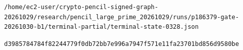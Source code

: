 \documentclass[10pt]{article}
\begin{document}
\texttt{\small /\allowbreak{}h\allowbreak{}o\allowbreak{}m\allowbreak{}e\allowbreak{}/\allowbreak{}e\allowbreak{}c\allowbreak{}2\allowbreak{}-\allowbreak{}u\allowbreak{}s\allowbreak{}e\allowbreak{}r\allowbreak{}/\allowbreak{}c\allowbreak{}r\allowbreak{}y\allowbreak{}p\allowbreak{}t\allowbreak{}o\allowbreak{}-\allowbreak{}p\allowbreak{}e\allowbreak{}n\allowbreak{}c\allowbreak{}i\allowbreak{}l\allowbreak{}-\allowbreak{}s\allowbreak{}i\allowbreak{}g\allowbreak{}n\allowbreak{}e\allowbreak{}d\allowbreak{}-\allowbreak{}g\allowbreak{}r\allowbreak{}a\allowbreak{}p\allowbreak{}h\allowbreak{}-\allowbreak{}2\allowbreak{}0\allowbreak{}2\allowbreak{}6\allowbreak{}1\allowbreak{}0\allowbreak{}2\allowbreak{}9\allowbreak{}/\allowbreak{}r\allowbreak{}e\allowbreak{}s\allowbreak{}e\allowbreak{}a\allowbreak{}r\allowbreak{}c\allowbreak{}h\allowbreak{}/\allowbreak{}p\allowbreak{}e\allowbreak{}n\allowbreak{}c\allowbreak{}i\allowbreak{}l\allowbreak{}\_\allowbreak{}l\allowbreak{}a\allowbreak{}r\allowbreak{}g\allowbreak{}e\allowbreak{}\_\allowbreak{}p\allowbreak{}r\allowbreak{}i\allowbreak{}m\allowbreak{}e\allowbreak{}\_\allowbreak{}2\allowbreak{}0\allowbreak{}2\allowbreak{}6\allowbreak{}1\allowbreak{}0\allowbreak{}2\allowbreak{}9\allowbreak{}/\allowbreak{}r\allowbreak{}u\allowbreak{}n\allowbreak{}s\allowbreak{}/\allowbreak{}p\allowbreak{}1\allowbreak{}8\allowbreak{}6\allowbreak{}3\allowbreak{}7\allowbreak{}9\allowbreak{}-\allowbreak{}g\allowbreak{}a\allowbreak{}t\allowbreak{}e\allowbreak{}-\allowbreak{}2\allowbreak{}0\allowbreak{}2\allowbreak{}6\allowbreak{}1\allowbreak{}0\allowbreak{}3\allowbreak{}0\allowbreak{}-\allowbreak{}b\allowbreak{}1\allowbreak{}/\allowbreak{}t\allowbreak{}e\allowbreak{}r\allowbreak{}m\allowbreak{}i\allowbreak{}n\allowbreak{}a\allowbreak{}l\allowbreak{}-\allowbreak{}p\allowbreak{}a\allowbreak{}r\allowbreak{}t\allowbreak{}i\allowbreak{}a\allowbreak{}l\allowbreak{}/\allowbreak{}t\allowbreak{}e\allowbreak{}r\allowbreak{}m\allowbreak{}i\allowbreak{}n\allowbreak{}a\allowbreak{}l\allowbreak{}-\allowbreak{}s\allowbreak{}t\allowbreak{}a\allowbreak{}t\allowbreak{}e\allowbreak{}-\allowbreak{}0\allowbreak{}3\allowbreak{}2\allowbreak{}8\allowbreak{}.\allowbreak{}j\allowbreak{}s\allowbreak{}o\allowbreak{}n\allowbreak{}}\par\texttt{\small d\allowbreak{}3\allowbreak{}9\allowbreak{}8\allowbreak{}5\allowbreak{}7\allowbreak{}8\allowbreak{}4\allowbreak{}7\allowbreak{}8\allowbreak{}4\allowbreak{}f\allowbreak{}8\allowbreak{}2\allowbreak{}2\allowbreak{}4\allowbreak{}4\allowbreak{}7\allowbreak{}7\allowbreak{}9\allowbreak{}f\allowbreak{}0\allowbreak{}d\allowbreak{}b\allowbreak{}7\allowbreak{}2\allowbreak{}b\allowbreak{}b\allowbreak{}7\allowbreak{}e\allowbreak{}9\allowbreak{}9\allowbreak{}6\allowbreak{}a\allowbreak{}7\allowbreak{}9\allowbreak{}4\allowbreak{}7\allowbreak{}f\allowbreak{}5\allowbreak{}7\allowbreak{}1\allowbreak{}e\allowbreak{}1\allowbreak{}1\allowbreak{}f\allowbreak{}a\allowbreak{}2\allowbreak{}3\allowbreak{}7\allowbreak{}0\allowbreak{}1\allowbreak{}b\allowbreak{}d\allowbreak{}8\allowbreak{}5\allowbreak{}6\allowbreak{}d\allowbreak{}9\allowbreak{}5\allowbreak{}8\allowbreak{}0\allowbreak{}b\allowbreak{}e\allowbreak{}}\par
\end{document}
